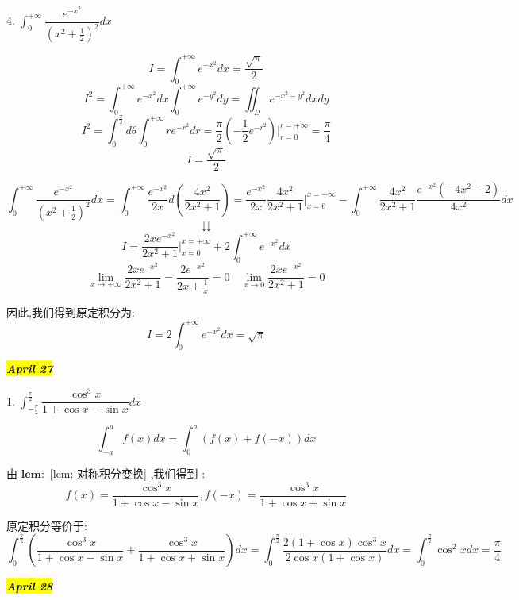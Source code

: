 
4. $\int_{0}^{+\infty}\dfrac{e^{-x^2}}{(x^2+\frac{1}{2})^2}dx$
\begin{lemma}[特殊积分]\label{lem: 特殊积分}
	
	$$I=\int_{0}^{+\infty}e^{-x^2}dx=\frac{\sqrt{\pi}}{2}$$
	$$I^2=\int_{0}^{+\infty}e^{-x^2}dx\int_{0}^{+\infty}e^{-y^2}dy=\iint_{D}e^{-x^2-y^2}dxdy$$
	$$I^2=\int_{0}^{\frac{\pi}{2}}d\theta\int_{0}^{+\infty}re^{-r^2}dr=\frac{\pi}{2}(-\frac{1}{2}e^{-r^2})|_{r=0}^{r=+\infty}=\frac{\pi}{4}$$
	$$I=\frac{\sqrt{\pi}}{2}$$
\end{lemma}

\begin{solution}
	$$\int_{0}^{+\infty}\frac{e^{-x^2}}{(x^2+\frac{1}{2})^2}dx=\int_{0}^{+\infty}\frac{e^{-x^2}}{2x}d(\frac{4x^2}{2x^2+1})=\frac{e^{-x^2}}{2x}\frac{4x^2}{2x^2+1}|_{x=0}^{x=+\infty}-\int_{0}^{+\infty}\frac{4x^2}{2x^2+1}\frac{e^{-x^2}(-4x^2-2)}{4x^2}dx$$
	$$\downdownarrows$$
	$$I=\frac{2xe^{-x^2}}{2x^2+1}|_{x=0}^{x=+\infty}+2\int_{0}^{+\infty}e^{-x^2}dx$$
	$$\lim\limits_{x\rightarrow +\infty}\frac{2xe^{-x^2}}{2x^2+1}=\frac{2e^{-x^2}}{2x+\frac{1}{x}}=0 \quad \lim\limits_{x\rightarrow 0}\frac{2xe^{-x^2}}{2x^2+1}=0$$
	
	因此,我们得到原定积分为: 
	$$I=2\int_{0}^{+\infty}e^{-x^2}dx=\sqrt{\pi}$$
\end{solution}

\hl{\textbf{\textit{April 27}}}

1. $\int_{-\frac{\pi}{2}}^{\frac{\pi}{2}}\dfrac{\cos^3 x}{1+\cos x-\sin x}dx$

\begin{lemma}[对称积分变换]\label{lem: 对称积分变换}
	
	$$\int_{-a}^{a}f(x)dx=\int_{0}^{a}(f(x)+f(-x))dx$$
\end{lemma}
\begin{solution}
	
	由 $\mathbf{lem: }$ \ref{lem: 对称积分变换} ,我们得到 : 
	$$f(x)=\frac{\cos^3 x}{1+\cos x-\sin x},f(-x)=\frac{\cos^3 x}{1+\cos x+\sin x}$$
	
	原定积分等价于: 
	$$\int_{0}^{\frac{\pi}{2}}(\frac{\cos^3 x}{1+\cos x-\sin x}+\frac{\cos^3 x}{1+\cos x+\sin x})dx=\int_{0}^{\frac{\pi}{2}}\frac{2(1+\cos x)\cos^3x}{2\cos x(1+\cos x)}dx=\int_{0}^{\frac{\pi}{2}}\cos^2 xdx=\frac{\pi}{4}$$
\end{solution}


\hl{\textbf{\textit{April 28}}}

